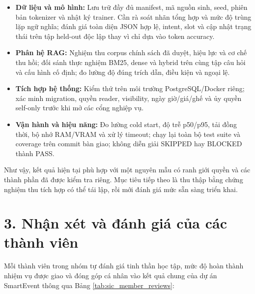 \begin{itemize}[nosep]
  \item \textbf{Dữ liệu và mô hình:} Lưu trữ đầy đủ manifest, mã nguồn sinh, seed, phiên bản tokenizer và nhật ký trainer. Cần rà soát nhãn tổng hợp và mức độ trùng lặp ngữ nghĩa; đánh giá toàn diện JSON hợp lệ, intent, slot và cập nhật trạng thái trên tập held-out độc lập thay vì chỉ dựa vào token accuracy.
  \item \textbf{Phân hệ RAG:} Nghiệm thu corpus chính sách đã duyệt, hiệu lực và cơ chế thu hồi; đối sánh thực nghiệm BM25, dense và hybrid trên cùng tập câu hỏi và cấu hình cố định; đo lường độ đúng trích dẫn, điều kiện và ngoại lệ.
  \item \textbf{Tích hợp hệ thống:} Kiểm thử trên môi trường PostgreSQL/Docker riêng; xác minh migration, quyền reader, visibility, ngày giờ/giá/ghế và ủy quyền self-only trước khi mở các cổng nghiệp vụ.
  \item \textbf{Vận hành và hiệu năng:} Đo lường cold start, độ trễ p50/p95, tải đồng thời, bộ nhớ RAM/VRAM và xử lý timeout; chạy lại toàn bộ test suite và coverage trên commit bàn giao; không diễn giải SKIPPED hay BLOCKED thành PASS.
\end{itemize}

Như vậy, kết quả hiện tại phù hợp với một nguyên mẫu có ranh giới quyền và các thành phần đã được kiểm tra riêng. Mục tiêu tiếp theo là thu thập bằng chứng nghiệm thu tích hợp có thể tái lập, rồi mới đánh giá mức sẵn sàng triển khai.

\newpage
\section*{3. Nhận xét và đánh giá của các thành viên}
{}

Mỗi thành viên trong nhóm tự đánh giá tinh thần học tập, mức độ hoàn thành nhiệm vụ được giao và đóng góp cá nhân vào kết quả chung của dự án SmartEvent thông qua Bảng \ref{tab:sic_member_reviews}:

